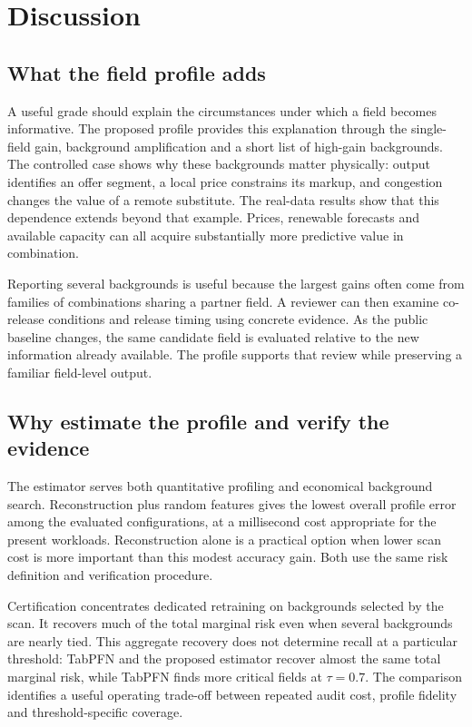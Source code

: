 \section{Discussion}\label{sec:discussion}
\subsection{What the field profile adds}
A useful grade should explain the circumstances under which a field becomes informative. The proposed profile provides this explanation through the single-field gain, background amplification and a short list of high-gain backgrounds. The controlled case shows why these backgrounds matter physically: output identifies an offer segment, a local price constrains its markup, and congestion changes the value of a remote substitute. The real-data results show that this dependence extends beyond that example. Prices, renewable forecasts and available capacity can all acquire substantially more predictive value in combination.

Reporting several backgrounds is useful because the largest gains often come from families of combinations sharing a partner field. A reviewer can then examine co-release conditions and release timing using concrete evidence. As the public baseline changes, the same candidate field is evaluated relative to the new information already available. The profile supports that review while preserving a familiar field-level output.

\subsection{Why estimate the profile and verify the evidence}
The estimator serves both quantitative profiling and economical background search. Reconstruction plus random features gives the lowest overall profile error among the evaluated configurations, at a millisecond cost appropriate for the present workloads. Reconstruction alone is a practical option when lower scan cost is more important than this modest accuracy gain. Both use the same risk definition and verification procedure.

Certification concentrates dedicated retraining on backgrounds selected by the scan. It recovers much of the total marginal risk even when several backgrounds are nearly tied. This aggregate recovery does not determine recall at a particular threshold: TabPFN and the proposed estimator recover almost the same total marginal risk, while TabPFN finds more critical fields at $\tau=0.7$. The comparison identifies a useful operating trade-off between repeated audit cost, profile fidelity and threshold-specific coverage.

